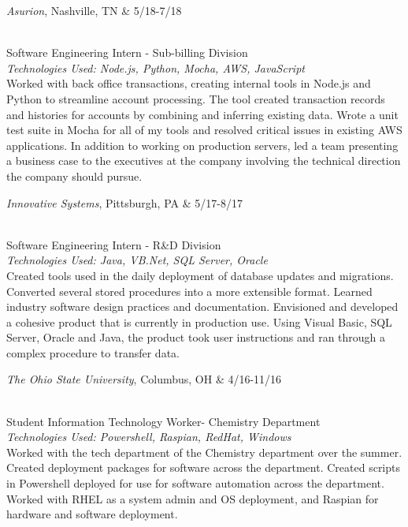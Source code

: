 \documentclass[]{res}
\begin{document}
{			
			\begin{ncolumn}{2}
			{\it Asurion}, Nashville, TN  & \hfill   5/18-7/18
			\end{ncolumn}\\
			Software Engineering Intern - Sub-billing Division\\
			{\textit{\footnotesize{Technologies Used: Node.js, Python, Mocha, AWS, JavaScript}}}\\
			Worked with back office transactions, creating internal tools in Node.js and Python to streamline account processing. The tool created transaction records and histories for accounts by combining and inferring existing data. Wrote a unit test suite in Mocha for all of my tools and resolved critical issues in existing AWS applications. In addition to working on production servers, led a team presenting a business case to the executives at the company involving the technical direction the company should pursue.
			
			\begin{ncolumn}{2}
			{\it Innovative Systems}, Pittsburgh, PA  & \hfill   5/17-8/17
			\end{ncolumn}\\
			Software Engineering Intern - R\&D Division \\
			{\textit{\footnotesize{Technologies Used: Java, VB.Net, SQL Server, Oracle}}}\\
			Created tools used in the daily deployment of database updates and migrations. Converted several stored procedures into a more extensible format. Learned industry software design practices and documentation. Envisioned and developed a cohesive product that is currently in production use. Using Visual Basic, SQL Server, Oracle and Java, the product took user instructions and ran through a complex procedure to transfer data.
			
			
			\begin{ncolumn}{2} 
			{\it The Ohio State University}, Columbus, OH & \hfill  4/16-11/16 
			\end{ncolumn}\\
			Student Information Technology Worker- Chemistry Department \\
			{\textit{\footnotesize{Technologies Used: Powershell, Raspian, RedHat, Windows}}}\\
			Worked with the tech department of the Chemistry department over the summer. Created deployment packages for software across the department. Created scripts in Powershell deployed for use for software automation across the department. Worked with RHEL as a system admin and OS deployment, and Raspian for hardware and software deployment.
			

}
\end{document}
